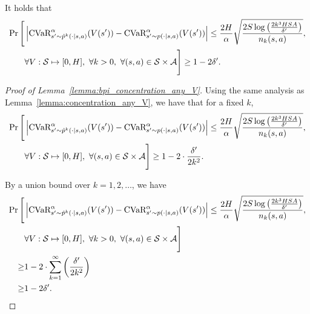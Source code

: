 \begin{lemma} \label{lemma:bpi_concentration_any_V} 
	It holds that
	\begin{align*}
		\Pr \Bigg[ &\left| \textup{CVaR}^{\alpha}_{s' \sim \hat{p}^k(\cdot|s,a)}(V(s')) - \textup{CVaR}^{\alpha}_{s' \sim p(\cdot|s,a)}(V(s')) \right| \leq \frac{2H}{\alpha}\sqrt{\frac{2S\log \left( \frac{2k^3HSA}{\delta'} \right)}{n_k(s,a)}} ,
		\\ & \forall V: \mathcal{S} \mapsto [0,H],\ \forall k>0,\ \forall (s,a) \in \mathcal{S} \times \mathcal{A} \Bigg] \geq 1-2\delta' .
	\end{align*}
\end{lemma}
\begin{proof}[Proof of Lemma~\ref{lemma:bpi_concentration_any_V}]
	Using the same analysis as Lemma~\ref{lemma:concentration_any_V}, we have that for a fixed $k$,
	\begin{align*}
		\Pr \Bigg[ &\left| \textup{CVaR}^{\alpha}_{s' \sim \hat{p}^k(\cdot|s,a)}(V(s')) - \textup{CVaR}^{\alpha}_{s' \sim p(\cdot|s,a)}(V(s')) \right| \leq \frac{2H}{\alpha}\sqrt{\frac{2S\log \left( \frac{2k^3HSA}{\delta'} \right)}{n_k(s,a)}} ,
		\\ & \forall V: \mathcal{S} \mapsto [0,H],\ \forall (s,a) \in \mathcal{S} \times \mathcal{A} \Bigg] \geq 1-2 \cdot \frac{\delta'}{2 k^2} .
	\end{align*}
	
	By a union bound over $k=1,2,\dots$, we have
	\begin{align*}
		\Pr \Bigg[ &\left| \textup{CVaR}^{\alpha}_{s' \sim \hat{p}^k(\cdot|s,a)}(V(s')) - \textup{CVaR}^{\alpha}_{s' \sim p(\cdot|s,a)}(V(s')) \right| \leq \frac{2H}{\alpha}\sqrt{\frac{2S\log \left( \frac{2k^3HSA}{\delta'} \right)}{n_k(s,a)}} ,
		\\ & \forall V: \mathcal{S} \mapsto [0,H],\ \forall k>0,\ \forall (s,a) \in \mathcal{S} \times \mathcal{A} \Bigg]
		\\
		\geq & 1-2 \cdot \sum_{k=1}^{\infty} \left( \frac{\delta'}{2 k^2} \right)
		\\
		\geq & 1-2\delta' .
	\end{align*}
\end{proof}



